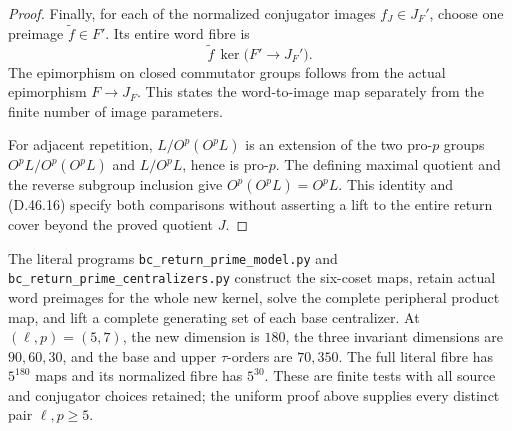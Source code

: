 \begin{proof}
Finally, for each of the normalized conjugator images
\(f_J\in J_F'\), choose one preimage
\(\widetilde f\in F'\). Its entire word fibre is
\[
       \widetilde f\,
         \ker\bigl(F'\longrightarrow J_F'\bigr).
 \tag{D.46.17}
\]
The epimorphism on closed commutator groups follows from
the actual epimorphism \(F\to J_F\).
This states the word-to-image map separately from the
finite number of image parameters.

For adjacent repetition, \(L/O^p(O^pL)\) is an
extension of the two pro-\(p\) groups
\(O^pL/O^p(O^pL)\) and \(L/O^pL\), hence is
pro-\(p\). The defining maximal quotient and the
reverse subgroup inclusion give
\(O^p(O^pL)=O^pL\).
This identity and \textup{(D.46.16)} specify both
comparisons without asserting a lift to the entire
return cover beyond the proved quotient \(J\).
\end{proof}

The literal programs
\texttt{bc\_return\_prime\_model.py} and
\texttt{bc\_return\_prime\_centralizers.py}
construct the six-coset maps, retain actual word
preimages for the whole new kernel, solve the complete
peripheral product map, and lift a complete generating
set of each base centralizer. At \((\ell,p)=(5,7)\),
the new dimension is \(180\), the three invariant
dimensions are \(90,60,30\), and the base and upper
\(\tau\)-orders are \(70,350\). The full literal
fibre has \(5^{180}\) maps and its normalized fibre
has \(5^{30}\). These are finite tests with all source
and conjugator choices retained; the uniform proof
above supplies every distinct pair \(\ell,p\geq5\).

